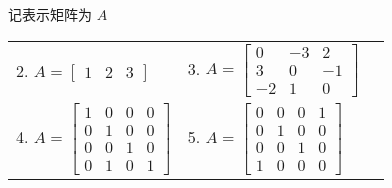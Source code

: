 	\begin{solution} 记表示矩阵为 $A$
		\begin{table}[htbp]
			\centering
			\begin{tabular}{p{0.3\textwidth}p{}p{}}
				2. $A=\begin{bmatrix}
				1&2&3
				\end{bmatrix}$&3. $A=\begin{bmatrix}
				0&-3&2\\
				3&0&-1\\
				-2&1&0
				\end{bmatrix}$\\
				4. $A=\begin{bmatrix}
					1&0&0&0\\
					0&1&0&0\\
					0&0&1&0\\
					0&1&0&1
				\end{bmatrix}$& 5. $A=\begin{bmatrix}
				0&0&0&1\\
				0&1&0&0\\
				0&0&1&0\\
				1&0&0&0
				\end{bmatrix}$ 
			\end{tabular}
		\end{table}
	\end{solution}
	
